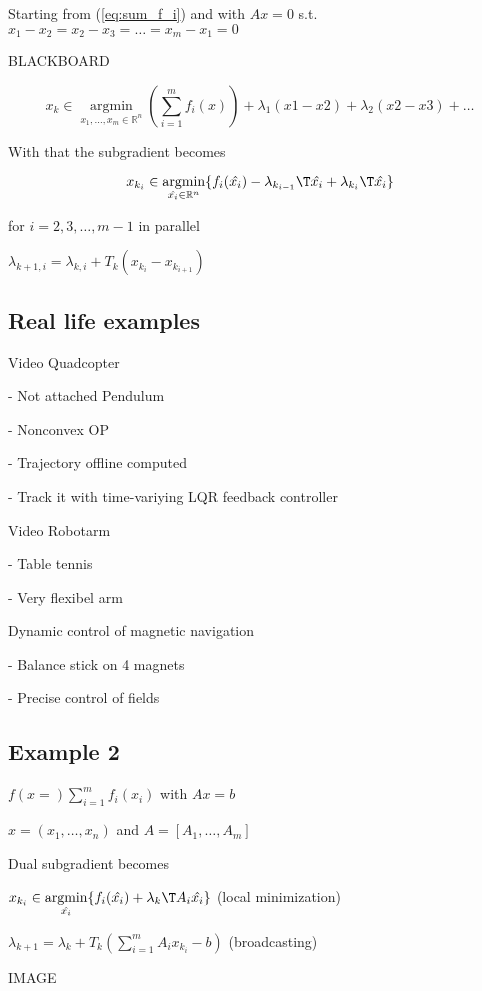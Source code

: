 Starting from (\ref{eq:sum_f_i}) and with $Ax=0$
s.t. $x_1-x_2=x_2-x_3=\dots=x_m-x_1=0$

BLACKBOARD

$$ x_{k}\in \underset{x_1,\dots,x_m\in \mathbb{R}^{n}} {\operatorname{argmin}}
	(\sum_{i = 1}^{m} f_i(x)) + \lambda_1(x1-x2) + \lambda_2(x2-x3) +\dots$$

With that the subgradient becomes

$$ x_{k_i}\in \underset{\hat{x_i}\in \mathbb{R}^{n}} {\operatorname{argmin}}
	\{f_i(\hat{x_i})-\lambda_{k_{i-1}}\T\hat{x_i}+\lambda_{k_{i}}\T\hat{x_i}\} $$

for $i=2,3,\dots,m-1$ in parallel


$\lambda_{k+1,i}=\lambda_{k,i}+T_k(x_{k_i}-x_{k_{i+1}})$

\subsection{Real life examples}

Video Quadcopter

- Not attached Pendulum

- Nonconvex OP

- Trajectory offline computed

- Track it with time-variying LQR feedback controller

Video Robotarm

- Table tennis

- Very flexibel arm

Dynamic control of magnetic navigation

- Balance stick on 4 magnets

- Precise control of fields

\subsection{Example 2}


$f(x=) \sum_{i = 1}^{m} f_i(x_i)$ with $Ax=b$

$x = (x_1,\dots,x_n)$ and $A=[A_1,\dots,A_m]$

Dual subgradient becomes

$x_{k_i}\in \underset{\hat{x_i}} {\operatorname{argmin}} \{f_i(\hat{x_i})+\lambda_{k}\T A_i\hat{x_i}\}$
(local minimization)


$\lambda_{k+1}=\lambda_{k}+T_k(\sum_{i = 1}^{m}A_ix_{k_i}-b)$
(broadcasting)

IMAGE  %


